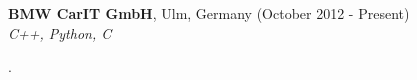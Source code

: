\documentclass[alan.tex]{subfiles}
\begin{document}
  \item \textbf{BMW CarIT GmbH}, Ulm, Germany (October 2012 - Present)\\
    \emph{C++, Python, C}
    \begin{my_desc}
    \item .
    \end{my_desc}
\end{document}
